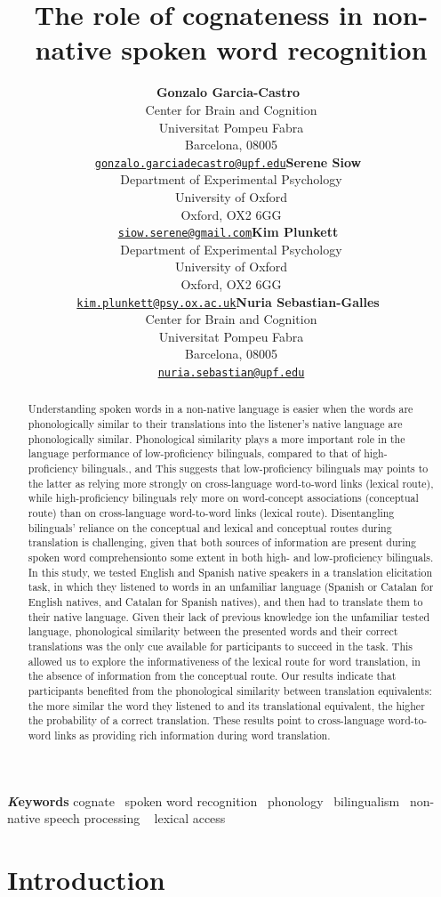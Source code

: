 \documentclass[
]{article}
\title{The role of cognateness in non-native spoken word recognition}
\author{\textbf{Gonzalo
Garcia-Castro}~\orcidlink{0000-0002-8553-4209}\\Center for Brain and
Cognition\\Universitat Pompeu Fabra\\Barcelona,
08005\\\texttt{\href{mailto:gonzalo.garciadecastro@upf.edu}{gonzalo.garciadecastro@upf.edu}}\And\textbf{Serene
Siow}~\orcidlink{0000-0001-6482-2191}\\Department of Experimental
Psychology\\University of Oxford\\Oxford, OX2
6GG\\\texttt{\href{mailto:siow.serene@gmail.com}{siow.serene@gmail.com}}\And\textbf{Kim
Plunkett}~\orcidlink{0000-0003-0216-7480}\\Department of Experimental
Psychology\\University of Oxford\\Oxford, OX2
6GG\\\texttt{\href{mailto:kim.plunkett@psy.ox.ac.uk}{kim.plunkett@psy.ox.ac.uk}}\And\textbf{Nuria
Sebastian-Galles}~\orcidlink{0000-0001-6938-2498}\\Center for Brain and
Cognition\\Universitat Pompeu Fabra\\Barcelona,
08005\\\texttt{\href{mailto:nuria.sebastian@upf.edu}{nuria.sebastian@upf.edu}}}
\date{}
\begin{document}
\maketitle
\begin{abstract}
Understanding spoken words in a non-native language is easier when the
words are phonologically similar to their translations into the
listener's native language are phonologically similar. Phonological
similarity plays a more important role in the language performance of
low-proficiency bilinguals, compared to that of high-proficiency
bilinguals., and This suggests that low-proficiency bilinguals may
points to the latter as relying more strongly on cross-language
word-to-word links (lexical route), while high-proficiency bilinguals
rely more on word-concept associations (conceptual route) than on
cross-language word-to-word links (lexical route). Disentangling
bilinguals' reliance on the conceptual and lexical and conceptual routes
during translation is challenging, given that both sources of
information are present during spoken word comprehensionto some extent
in both high- and low-proficiency bilinguals. In this study, we tested
English and Spanish native speakers in a translation elicitation task,
in which they listened to words in an unfamiliar language (Spanish or
Catalan for English natives, and Catalan for Spanish natives), and then
had to translate them to their native language. Given their lack of
previous knowledge ion the unfamiliar tested language, phonological
similarity between the presented words and their correct translations
was the only cue available for participants to succeed in the task. This
allowed us to explore the informativeness of the lexical route for word
translation, in the absence of information from the conceptual route.
Our results indicate that participants benefited from the phonological
similarity between translation equivalents: the more similar the word
they listened to and its translational equivalent, the higher the
probability of a correct translation. These results point to
cross-language word-to-word links as providing rich information during
word translation.
\end{abstract}
{\bfseries \emph Keywords}
\def\sep{\textbullet\ }
cognate \sep spoken word
recognition \sep phonology \sep bilingualism \sep non-native speech
processing \sep 
lexical access


\section{Introduction}\label{introduction}
\end{document}
